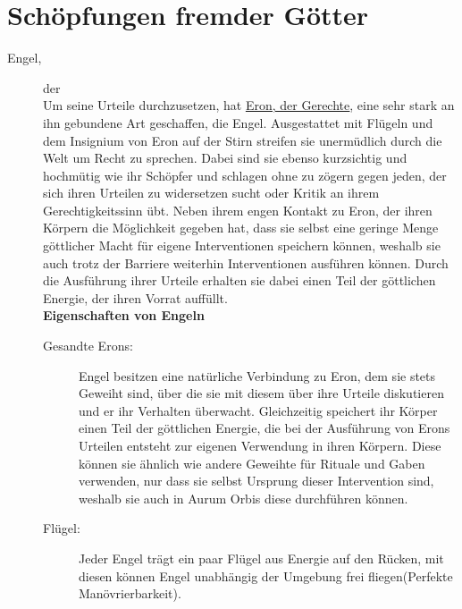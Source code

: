 \documentclass[a4paper,12pt,oneside]{book}
\begin{document}
\chapter{Schöpfungen fremder Götter}
\begin{description}

\item[Engel,] der\label{Engel}
\\Um seine Urteile durchzusetzen, hat \uline{\hyperref[Eron]{Eron, der Gerechte}}, eine sehr stark an ihn gebundene Art geschaffen, die Engel. Ausgestattet mit Flügeln und dem Insignium von Eron auf der Stirn streifen sie unermüdlich durch die Welt um Recht zu sprechen. Dabei sind sie ebenso kurzsichtig und hochmütig wie ihr Schöpfer und schlagen ohne zu zögern gegen jeden, der sich ihren Urteilen zu widersetzen sucht oder Kritik an ihrem Gerechtigkeitssinn übt. Neben ihrem engen Kontakt zu Eron, der ihren Körpern die Möglichkeit gegeben hat, dass sie selbst eine geringe Menge göttlicher Macht für eigene Interventionen speichern können, weshalb sie auch trotz der Barriere weiterhin Interventionen ausführen können. Durch die Ausführung ihrer Urteile erhalten sie dabei einen Teil der göttlichen Energie, der ihren Vorrat auffüllt. 
\\\textbf{Eigenschaften von Engeln}
\begin{description}
\item[Gesandte Erons:]
Engel besitzen eine natürliche Verbindung zu Eron, dem sie stets Geweiht sind, über die sie mit diesem über ihre Urteile diskutieren und er ihr Verhalten überwacht. Gleichzeitig speichert ihr Körper einen Teil der göttlichen Energie, die bei der Ausführung von Erons Urteilen entsteht zur eigenen Verwendung in ihren Körpern. Diese können sie ähnlich wie andere Geweihte für Rituale und Gaben verwenden, nur dass sie selbst Ursprung dieser Intervention sind, weshalb sie auch in Aurum Orbis diese durchführen können.
\item[Flügel:]
Jeder Engel trägt ein paar Flügel aus Energie auf den Rücken, mit diesen können Engel unabhängig der Umgebung frei fliegen(Perfekte Manövrierbarkeit).
\end{description} 


\end{description}
\end{document}
